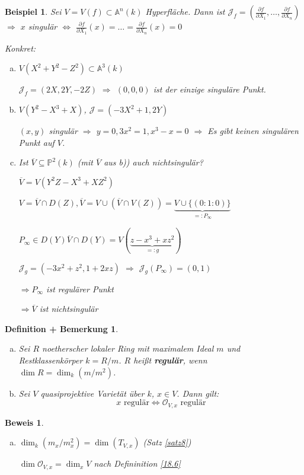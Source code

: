 \documentclass[a4paper, 12pt, numbers=noendperiod, chapterprefix=true]{scrbook}
\theoremstyle{break}
\newtheorem{DefBem}[Def]{Definition + Bemerkung}
\theoremstyle{nonumberbreak}
\newtheorem{nnBsp}{Beispiel}
\newtheorem{Bew}{Beweis}
\theoremstyle{nonumberplain}
\newcommand{\emp}[1]{\textbf{\emph{#1}}}
\newcommand{\defterm}[1]{{\index{#1}}\emp{#1}}
\newcommand{\A}{\mathbb{A}}
\newcommand{\IP}{\mathbb{P}}%
\newcommand{\calJ}{\mathcal{J}}
\newcommand{\calO}{\mathcal{O}}
\begin{document}
\begin{nnBsp}
Sei $V=V(f)\subset\A^n(k)$ Hyperfl\"ache. Dann ist $\calJ_f=\left( \frac{\partial f}{\partial X_1},\ldots ,\frac{\partial f}{\partial X_n} \right)$ $\Longrightarrow$ $x$ singul\"ar $\Leftrightarrow$ $\frac{\partial f}{\partial X_1}(x)=\ldots =\frac{\partial f}{\partial X_n}(x)=0$

\emph{Konkret:}\begin{enumerate}[a)]
\item
	$V(X^2+Y^2-Z^2)\subset\A^3(k)$
	
	$\calJ_f=(2X,2Y,-2Z)$ $\Rightarrow $ $(0,0,0)$ ist der einzige singul\"are Punkt.
\item
	$V(Y^2-X^3+X)$, $\calJ=(-3X^2+1,2Y)$
	
	$(x,y)$ singul\"ar $\Rightarrow$ $y=0, 3x^2=1, x^3-x=0$ $\Rightarrow $ Es gibt keinen singul\"aren Punkt auf $V$.
\item
	Ist $\overline V\subseteq\IP^2(k)$ (mit $\overline V$ aus b)) auch nichtsingul\"ar?
	
	$\overline V=V(Y^2Z-X^3+XZ^2)$
	
	$V=\overline V\cap D(Z), \overline V=V\cup(\overline V\cap V(Z)) =\underbrace{V\cup\{(0:1:0)\}}_{=:P_\infty}$
	
	$P_\infty\in D(Y) \overline V\cap D(Y)=V(\underbrace{z-x^3+xz^2}_{=:g})$
	
	$\calJ_g=(-3x^2+z^2,1+2xz)$ $\Rightarrow $ $\calJ_g(P_\infty)=(0,1)$
	
	$\Rightarrow P_\infty$ ist regul\"arer Punkt
	
	$\Rightarrow \overline V$ ist nichtsingul\"ar
\end{enumerate}\end{nnBsp}

\begin{DefBem}\label{19.3}\begin{enumerate}[a)]
\item
	Sei $R$ noetherscher lokaler Ring mit maximalem Ideal $m$ und Restklassenk\"orper $k=R/m$. $R$ hei\ss t \defterm{regul\"ar}, wenn $\dim R=\dim_k(m/m^2)$.
\item\label{19.3b}
	Sei $V$ quasiprojektive Variet\"at \"uber $k$, $x\in V$. Dann gilt:
		\[x \text{ regul\"ar} \Leftrightarrow \calO_{V,x} \text{ regul\"ar}\]
\end{enumerate}\end{DefBem}

\begin{Bew}\begin{enumerate}[a)]
\item[b)]
	$\dim_k(m_x/m_x^2)=\dim(T_{V,x})$ (Satz \ref{satz8})
	
	$\dim \calO_{V,x}=\dim_x V$ nach Defininition \ref{18.6}
\end{enumerate}\end{Bew}
\end{document}
